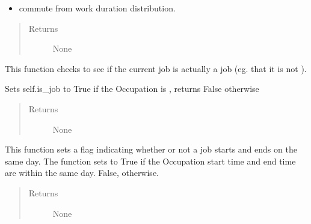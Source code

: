 \documentclass[letterpaper,10pt,english]{sphinxmanual}
\begin{document}
\begin{fulllineitems}
\begin{fulllineitems}
\begin{itemize}
\item {} 
commute from work duration distribution.

\end{itemize}
\begin{quote}\begin{description}
\item[{Returns}] \leavevmode
None

\end{description}\end{quote}

\end{fulllineitems}


\begin{fulllineitems}
\label{occupation:occupation.Occupation.set_is_job}
This function checks to see if the current job is actually a job (eg. that it is not         ).

Sets self.is\_job to True if the Occupation is , returns False otherwise
\begin{quote}\begin{description}
\item[{Returns}] \leavevmode
None

\end{description}\end{quote}

\end{fulllineitems}


\begin{fulllineitems}
\label{occupation:occupation.Occupation.set_is_same_day}
This function sets a flag indicating whether or not a job starts and ends         on the same day. The function sets  to True if the Occupation start time and end time         are within the same day. False, otherwise.
\begin{quote}\begin{description}
\item[{Returns}] \leavevmode
None

\end{description}\end{quote}

\end{fulllineitems}


\end{fulllineitems}
\end{document}
